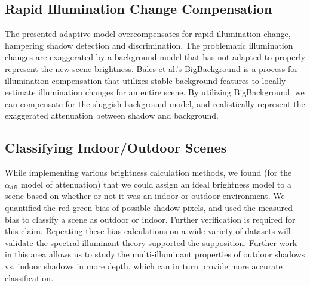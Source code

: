 \subsection{Rapid Illumination Change Compensation}

The presented adaptive model overcompensates for rapid illumination change, hampering shadow detection and discrimination. The problematic illumination changes are exaggerated by a background model that has not adapted to properly represent the new scene brightness. Bales et al.'s BigBackground is a process for illumination compensation that utilizes stable background features to locally estimate illumination changes for an entire scene. By utilizing BigBackground, we can compensate for the sluggish background model, and realistically represent the exaggerated attenuation between shadow and background.

\subsection{Classifying Indoor/Outdoor Scenes}

While implementing various brightness calculation methods, we found (for the $\alpha_{dB}$ model of attenuation) that we could assign an ideal brightness model to a scene based on whether or not it was an indoor or outdoor environment. We quantified the red-green bias of possible shadow pixels, and used the measured bias to classify a scene as outdoor or indoor. Further verification is required for this claim. Repeating these bias calculations on a wide variety of datasets will validate the spectral-illuminant theory supported the supposition. Further work in this area allows us to study the multi-illuminant properties of outdoor shadows vs. indoor shadows in more depth, which can in turn provide more accurate classification. 